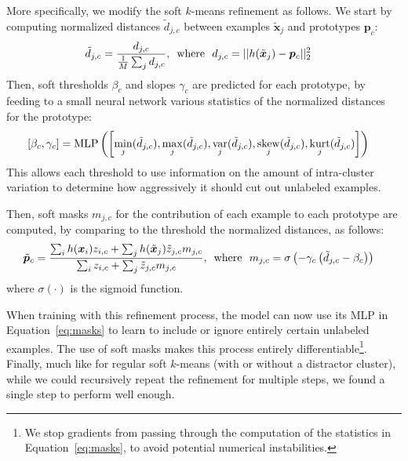 More specifically, we modify the soft $k$-means refinement as follows. We start by computing 
normalized distances $\tilde{d}_{j,c}$ between examples $\tilde{\bm{x}}_j$ and prototypes $\bm{p}_c$: 
\begin{align}
    \tilde{d}_{j,c}=\frac{d_{j,c}}
    {\frac{1}{M} \sum_j d_{j,c}},&~~{\rm where }~~ d_{j,c} = ||h(\tilde{\bm{x}}_j) - \bm{p}_c||^2_2
\end{align}
Then, soft thresholds $\beta_c$ and slopes $\gamma_c$ are predicted for each prototype, by feeding 
to a small neural network various statistics of the normalized distances for the prototype:
\begin{align}
    \left[\beta_c, \gamma_c \right] &= {\rm MLP} \left(
    \left[\min_j(\tilde{d}_{j,c}), \max_j(\tilde{d}_{j,c}), 
    \operatorname*{var}_j(\tilde{d}_{j,c}), \operatorname*{skew}_j(\tilde{d}_{j,c}), 
    \operatorname*{kurt}_j(\tilde{d}_{j,c}) \right] \right) \label{eq:masks}
\end{align}
This allows each threshold to use information on the amount of intra-cluster variation to determine 
how aggressively it should cut out unlabeled examples.

Then, soft masks $m_{j,c}$ for the contribution of each example to each prototype are computed, by 
comparing to the threshold the normalized distances, as follows:
\begin{align}
\tilde{\bm{p}}_c = \frac{\sum_i h(\bm{x}_i) z_{i,c} + \sum_j h(\tilde{\bm{x}}_j) \tilde{z}_{j,c} m_{j,c}}
                             {\sum_i z_{i,c} + \sum_j \tilde{z}_{j,c} m_{j,c}},
    &~~{\rm where }~~ m_{j,c} = \sigma \left(-\gamma_c \left(
    \tilde{d}_{j,c}-\beta_c \right) \right)
\end{align}
where $\sigma(\cdot)$ is the sigmoid function. 

When training with this refinement process, the model can now use its MLP in Equation~\ref{eq:masks}
to learn to include or ignore entirely certain unlabeled examples. The use of soft masks makes this
process entirely differentiable\footnote{We stop gradients from passing through the computation of
the statistics in Equation~\ref{eq:masks}, to avoid potential numerical instabilities.}.
Finally, much like for regular soft $k$-means (with or without a distractor cluster), while we could
recursively repeat the refinement for multiple steps, we found a single step to perform well enough.
